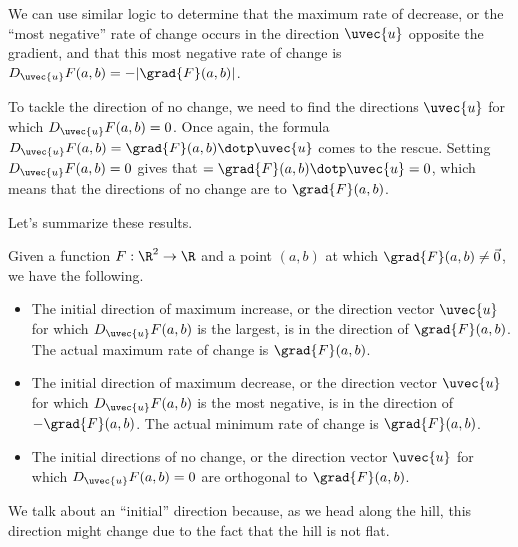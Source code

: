\documentclass{ximera}
\begin{document}
We can use similar logic to determine that the maximum rate of decrease, or the ``most negative'' rate of change occurs in the direction $\uvec{u}$ opposite the gradient, and that this most negative rate of change is $D_{\uvec{u}}F(a,b) = -|\grad{F}(a,b)|$.

To tackle the direction of no change, we need to find the directions $\uvec{u}$ for which $D_{\uvec{u}} F(a,b) =0$. Once again, the formula $D_{\uvec{u}}F(a,b) = \grad{F}(a,b) \dotp \uvec{u}$ comes to the rescue. Setting $D_{\uvec{u}} F(a,b) =0$ gives that $= \grad{F}(a,b) \dotp \uvec{u} = 0$, which means that the directions of no change are  to $\grad{F}(a,b)$.

Let's summarize these results.

\begin{theorem}

Given a function $F:\R^2 \to \R$ and a point $(a,b)$ at which $\grad{F}(a,b) \neq \vec{0}$, we have the following.

\begin{itemize}

\item The initial direction of maximum increase, or the direction vector $\uvec{u}$ for which $D_{\uvec{u}} F(a,b)$ is the largest, is in the direction of $\grad{F}(a,b)$. The actual maximum rate of change is $\grad{F}(a,b)$.

\item The initial direction of maximum decrease, or the direction vector $\uvec{u}$ for which $D_{\uvec{u}} F(a,b)$ is the most negative, is in the direction of $-\grad{F}(a,b)$. The actual minimum rate of change is $\grad{F}(a,b)$.

\item The initial directions of no change, or the direction vector $\uvec{u}$ for which $D_{\uvec{u}} F(a,b)=0$ are orthogonal to $\grad{F}(a,b)$.

\end{itemize}

\end{theorem}

\begin{remark}

We talk about an ``initial'' direction because, as we head along the hill, this direction might change due to the fact that the hill is not flat.

\end{remark}
\end{document}
